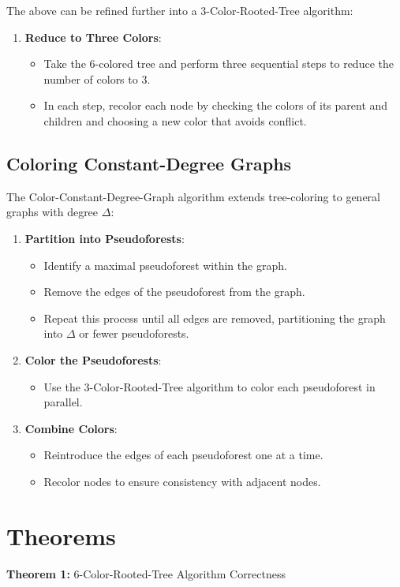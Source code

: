 \documentclass{article}
\begin{document}
The above can be refined further into a 3-Color-Rooted-Tree algorithm:
\begin{enumerate}
    \item \textbf{Reduce to Three Colors}:
    \begin{itemize}
        \item Take the 6-colored tree and perform three sequential steps to reduce the number of colors to 3.
        \item In each step, recolor each node by checking the colors of its parent and children and choosing a new color that avoids conflict.
    \end{itemize}
\end{enumerate}

\subsection{Coloring Constant-Degree Graphs}
The Color-Constant-Degree-Graph algorithm extends tree-coloring to general graphs with degree $\Delta$:

\begin{enumerate}
    \item \textbf{Partition into Pseudoforests}:
    \begin{itemize}
        \item Identify a maximal pseudoforest within the graph.
        \item Remove the edges of the pseudoforest from the graph.
        \item Repeat this process until all edges are removed, partitioning the graph into $\Delta$ or fewer pseudoforests.
    \end{itemize}
    \item \textbf{Color the Pseudoforests}:
    \begin{itemize}
        \item Use the 3-Color-Rooted-Tree algorithm to color each pseudoforest in parallel.
    \end{itemize}
    \item \textbf{Combine Colors}:
    \begin{itemize}
        \item Reintroduce the edges of each pseudoforest one at a time.
        \item Recolor nodes to ensure consistency with adjacent nodes.
    \end{itemize}
\end{enumerate}

\section{Theorems}
\textbf{Theorem 1:} 6-Color-Rooted-Tree Algorithm Correctness
\end{document}
